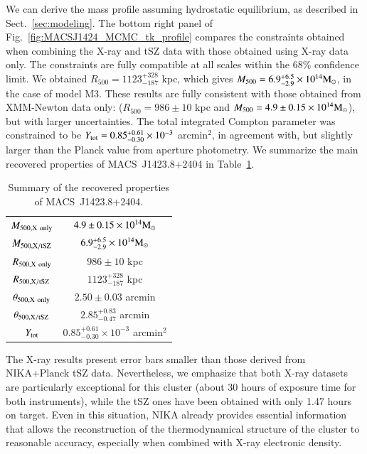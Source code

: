 \documentclass[twocolumn,traditabstract]{aa}
\begin{document}
We can derive the mass profile assuming hydrostatic equilibrium, as described in Sect.~\ref{sec:modeling}. The bottom right panel of Fig.~\ref{fig:MACSJ1424_MCMC_tk_profile} compares the constraints obtained when combining the X-ray and tSZ data with those obtained using X-ray data only. The constraints are fully compatible at all scales within the 68\% confidence limit. We obtained $R_{500} = 1123^{+328}_{-187}$ kpc, which gives $M_{500} = 6.9^{+6.5}_{-2.9}  \times 10^{14} {\rm M}_{\odot}$, in the case of model M3. These results are fully consistent with those obtained from XMM-Newton data only: ($R_{500} = 986 \pm 10$ kpc and $M_{500} = 4.9 \pm 0.15 \times 10^{14} {\rm M}_{\odot}$), but with larger uncertainties. The total integrated Compton parameter was constrained to be $Y_{\rm tot} = 0.85^{+0.61}_{-0.30} \times 10^{-3}$ arcmin$^2$, in agreement with, but slightly larger than the Planck value from aperture photometry. We summarize the main recovered properties of \mbox{MACS~J1423.8+2404} in Table~\ref{tab:summary}.
\begin{table}[h]
\caption{Summary of the recovered properties of \mbox{MACS~J1423.8+2404}.}
\begin{center}
\begin{tabular}{cc}
\hline
\hline
$M_{500, {\rm X \ only}}$ & $4.9 \pm 0.15 \times 10^{14} {\rm M}_{\odot}$ \\
$M_{500, {\rm X/tSZ}}$ & $6.9^{+6.5}_{-2.9}  \times 10^{14} {\rm M}_{\odot}$\\
$R_{500, {\rm X \ only}}$ & $986 \pm 10$ kpc\\
$R_{500, {\rm X/tSZ}}$ & $1123^{+328}_{-187}$ kpc\\
$\theta_{500, {\rm X \ only}}$ & $2.50 \pm 0.03$ arcmin \\
$\theta_{500, {\rm X/tSZ}}$ & $2.85^{+0.83}_{-0.47}$ arcmin\\
$Y_{\rm tot}$ & $0.85^{+0.61}_{-0.30} \times 10^{-3}$ arcmin$^2$ \\
\hline
\end{tabular}
\end{center}
\label{tab:summary}
\end{table}

The X-ray results present error bars smaller than those derived from NIKA+Planck tSZ data. Nevertheless, we emphasize that both X-ray datasets are particularly exceptional for this cluster (about 30 hours of exposure time for both instruments), while the tSZ ones have been obtained with only 1.47 hours on target. Even in this situation, NIKA already provides essential information that allows the reconstruction of the thermodynamical structure of the cluster to reasonable accuracy, especially when combined with X-ray  electronic density.
\end{document}
